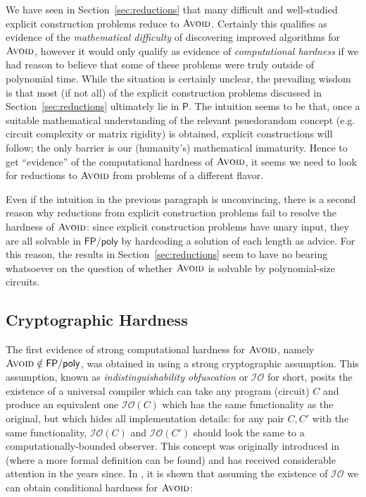 \documentclass[11pt]{article}
\newcommand{\avoid}{\textsc{Avoid}}
\begin{document}
We have seen in Section~\ref{sec:reductions} that many difficult and well-studied explicit construction problems reduce to $\avoid$. Certainly this qualifies as evidence of the \emph{mathematical difficulty} of discovering improved algorithms for $\avoid$, however it would only qualify as evidence of \emph{computational hardness} if we had reason to believe that some of these problems were truly outside of polynomial time. While the situation is certainly unclear, the prevailing wisdom is that most (if not all) of the explicit construction problems discussed in Section~\ref{sec:reductions} ultimately lie in $\mathsf{P}$. The intuition seems to be that, once a suitable mathematical understanding of the relevant psuedorandom concept (e.g. circuit complexity or matrix rigidity) is obtained, explicit constructions will follow; the only barrier is our (humanity's) mathematical immaturity. Hence to get ``evidence'' of the computational hardness of $\avoid$, it seems we need to look for reductions to $\avoid$ from problems of a different flavor.

Even if the intuition in the previous paragraph is unconvincing, there is a second reason why reductions from explicit construction problems fail to resolve the hardness of $\avoid$: since explicit construction problems have unary input, they are all solvable in $\mathsf{FP/poly}$ by hardcoding a solution of each length as advice. For this reason, the results in Section~\ref{sec:reductions} seem to have no bearing whatsoever on the question of whether $\avoid$ is solvable by polynomial-size circuits.

\subsection{Cryptographic Hardness}\label{sec:crypto}

The first evidence of strong computational hardness for $\avoid$, namely $\avoid \notin \mathsf{FP/poly}$, was obtained in \cite{avoid-io} using a strong cryptographic assumption. This assumption, known as \emph{indistinguishability obfuscation} or $\mathcal{IO}$ for short, posits the existence of a universal compiler which can take any program (circuit) $C$ and produce an equivalent one $\mathcal{IO}(C)$ which has the same functionality as the original, but which hides all implementation details: for any pair $C,C'$ with the same functionality, $\mathcal{IO}(C)$ and $\mathcal{IO}(C')$ should look the same to a computationally-bounded observer. This concept was originally introduced in \cite{obfuscation} (where a more formal definition can be found) and has received considerable attention in the years since. In \cite{avoid-io}, it is shown that assuming the existence of $\mathcal{IO}$ we can obtain conditional hardness for $\avoid$:
\end{document}
